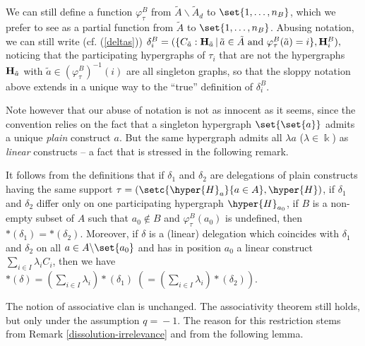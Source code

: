 We can still define a function $\varphi_{\tau}^B$ from $\tilde{A}\backslash\tilde{A}_d$ to $\set{1,\ldots,n_B}$, which we prefer to see as a partial function from $\tilde{A}$ to $\set{1,\ldots,n_B}$. Abusing notation, we can still write (cf. (\ref{deltas}))
$\delta^B_i=(\{C_{\tilde{a}}:{\bf H}_{\tilde{a}}\,|\, \tilde{a}\in \tilde{A} \mbox{ and }\varphi_\tau^B(\tilde{a})=i\},{\bf H}_i^B),$
noticing  that the  participating hypergraphs of  $\tau_i$ that are not the hypergraphs  ${\bf H}_{\tilde{a}}$ with 
$\tilde{a}\in (\varphi_\tau^B)^{-1}(i)$
are all singleton graphs, so that the sloppy notation above extends in a unique way to the ``true'' definition of $\delta^B_i$.

Note however that our abuse of notation is not as innocent as it seems, since the convention relies on the fact that a singleton hypergraph 
$\set{\set{a}}$ admits a unique {\it plain} construct $a$. 
But the same hypergraph admits all $\lambda a$ ($\lambda\in\Bbbk$) as {\it linear} constructs -- a fact that is stressed in the following remark.



\begin{remark} \label{dissolution-irrelevance}
It follows from the definitions that
if $\delta_1$ and $\delta_2$ are delegations of plain constructs having the same support $\tau=(\setc{\hyper{H}_a}{a\in A},\hyper{H})$, if $\delta_1$ and $\delta_2$ differ only on one participating hypergraph $\hyper{H}_{a_0}$,  if $B$ is a non-empty subset of $A$ such that $a_0\nin B$ and $\varphi_\tau^B(a_0)$ is undefined, then $\ast(\delta_1)=\ast(\delta_2)$.  Moreover, if $\delta$ is a (linear) delegation which coincides with $\delta_1$ and $\delta_2$ on all $a\in A\backslash\set{a_0}$ and has in position $a_0$ a linear construct $\sum_{i\in I} \lambda_i C_i$, then we have $\ast(\delta) = (\sum_{i\in I} \lambda_i) \ast\!(\delta_1) \; (= (\sum_{i\in I} \lambda_i) \ast\!(\delta_2))$.
\end{remark}

The notion of associative clan is unchanged.  
The associativity theorem still holds, but only under the assumption $q\!=\!-1$.  The reason for this restriction stems from Remark \ref{dissolution-irrelevance} and from the following lemma.

